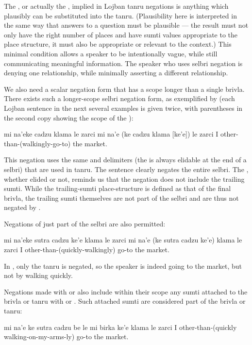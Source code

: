 The , or actually the , implied in Lojban
    tanru negations is anything which plausibly can be substituted
    into the tanru. (Plausibility here is interpreted in the same
    way that answers to a  question must be plausible --- the
    result must not only have the right number of places and have
    sumti values appropriate to the place structure, it must also
    be appropriate or relevant to the context.) This minimal
    condition allows a speaker to be intentionally vague, while
    still communicating meaningful information. The speaker who
    uses selbri negation is denying one relationship, while
    minimally asserting a different relationship.

We also need a scalar negation form that has a scope longer
    than a single brivla. There exists such a longer-scope selbri
    negation form, as exemplified by (each Lojban sentence in the
    next several examples is given twice, with parentheses in the
    second copy showing the scope of the ):
\begin{example}
mi na'eke cadzu klama  le zarci\n
mi na'e (ke cadzu klama [ke'e]) le zarci\n
I other-than-(walkingly-go-to) the market.
\end{example}

This negation uses the same  and  delimiters
    (the  is always elidable at the end of a selbri) that
    are used in tanru. The sentence clearly negates the entire
    selbri. The , whether elided or not, reminds us that
    the negation does not include the trailing sumti. While the
    trailing-sumti place-structure is defined as that of the final
    brivla, the trailing sumti themselves are not part of the
    selbri and are thus not negated by .

Negations of just part of the selbri are also permitted:
\begin{example}
mi na'eke sutra cadzu ke'e klama le zarci\n
mi na'e (ke sutra cadzu ke'e) klama le zarci\n
I other-than-(quickly-walkingly) go-to the market.
\end{example}

In , only the 
    tanru is negated, so the speaker is indeed going to the market,
    but not by walking quickly.

Negations made with  or  also include
    within their scope any sumti attached to the brivla or tanru
    with  or . Such attached sumti are considered part
    of the brivla or tanru:
\begin{example}
mi na'e ke sutra cadzu be le mi birka ke'e\n
\T	klama le zarci\n
I other-than-(quickly walking-on-my-arms-ly)\n
\T	go-to the market.
\end{example}

